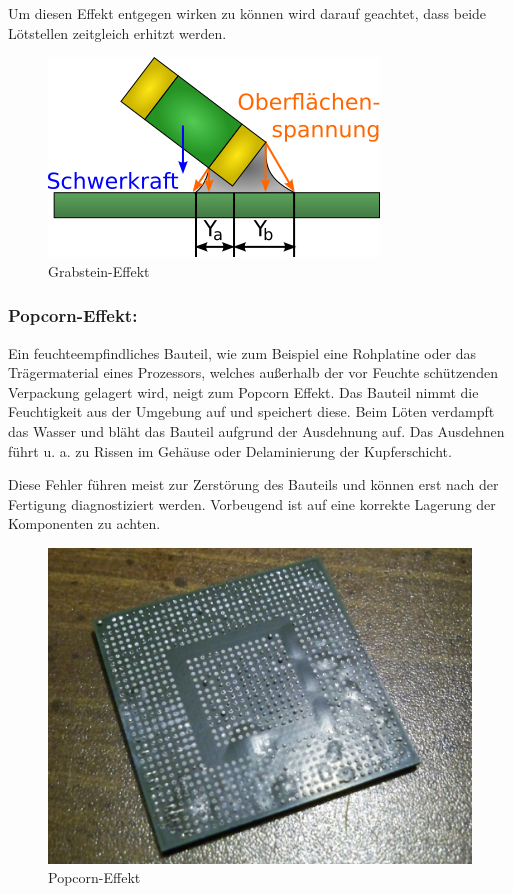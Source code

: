 Um diesen Effekt entgegen wirken zu können wird darauf geachtet, dass beide Lötstellen zeitgleich erhitzt werden.
\begin{figure}[H]
	\centering
	\includegraphics[width=.5\linewidth]{images/technische_grundlagen/grabsteinEffekt.png}%
	\caption{Grabstein-Effekt \cite{wikimedia-grabstein}}
\end{figure}

\subsubsection{Popcorn-Effekt:} %
Ein feuchteempfindliches Bauteil, wie zum Beispiel eine Rohplatine oder das Trägermaterial eines Prozessors, welches außerhalb der vor Feuchte schützenden Verpackung gelagert wird, neigt zum Popcorn Effekt.
Das Bauteil nimmt die Feuchtigkeit aus der Umgebung auf und speichert diese.
Beim Löten verdampft das Wasser und bläht das Bauteil aufgrund der Ausdehnung auf.
Das Ausdehnen führt u. a. zu Rissen im Gehäuse oder Delaminierung der Kupferschicht.\par

Diese Fehler führen meist zur Zerstörung des Bauteils und können erst nach der Fertigung diagnostiziert werden.
Vorbeugend ist auf eine korrekte Lagerung der Komponenten zu achten.
\begin{figure}[H]
	\centering
	\includegraphics[width=.5\linewidth]{images/technische_grundlagen/popcornEffekt.jpg}%
	\caption{Popcorn-Effekt \cite{wikimedia-popcorn}}
\end{figure}

